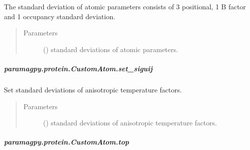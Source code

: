\documentclass[a4paper,10pt,english]{sphinxmanual}
\begin{document}
\begin{fulllineitems}
\begin{fulllineitems}
\begin{fulllineitems}
The standard deviation of atomic parameters consists
of 3 positional, 1 B factor and 1 occupancy standard
deviation.
\begin{quote}\begin{description}
\item[{Parameters}] \leavevmode
{} (\sphinxstyleliteralemphasis{\sphinxupquote{ (}}\sphinxstyleliteralemphasis{\sphinxupquote{)}}) \textendash{} standard deviations of atomic parameters.

\end{description}\end{quote}

\end{fulllineitems}



\subparagraph{paramagpy.protein.CustomAtom.set\_siguij}
\label{\detokenize{reference/generated/paramagpy.protein.CustomAtom.set_siguij:paramagpy-protein-customatom-set-siguij}}\label{\detokenize{reference/generated/paramagpy.protein.CustomAtom.set_siguij::doc}}

\begin{fulllineitems}
\label{\detokenize{reference/generated/paramagpy.protein.CustomAtom.set_siguij:paramagpy.protein.CustomAtom.set_siguij}}
Set standard deviations of anisotropic temperature factors.
\begin{quote}\begin{description}
\item[{Parameters}] \leavevmode
{} (\sphinxstyleliteralemphasis{\sphinxupquote{ (}}\sphinxstyleliteralemphasis{\sphinxupquote{)}}) \textendash{} standard deviations of anisotropic temperature factors.

\end{description}\end{quote}

\end{fulllineitems}



\subparagraph{paramagpy.protein.CustomAtom.top}
\label{\detokenize{reference/generated/paramagpy.protein.CustomAtom.top:paramagpy-protein-customatom-top}}\label{\detokenize{reference/generated/paramagpy.protein.CustomAtom.top::doc}}


\end{fulllineitems}
\end{fulllineitems}
\end{document}
